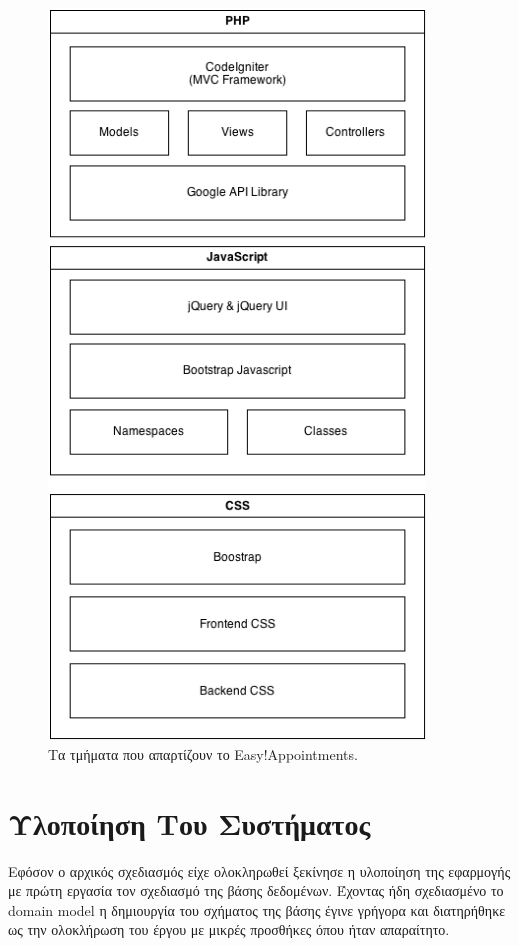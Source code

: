 \begin{figure}[ht!]
\centering
\includegraphics[width=100mm]{images/system-architecture.png}
\caption{Τα τμήματα που απαρτίζουν το Easy!Appointments.}
\label{system-architecture}
\end{figure}

\section{Υλοποίηση Του Συστήματος}
Εφόσον ο αρχικός σχεδιασμός είχε ολοκληρωθεί ξεκίνησε η υλοποίηση της εφαρμογής με πρώτη εργασία τον σχεδιασμό της βάσης δεδομένων. Έχοντας ήδη σχεδιασμένο το domain model η δημιουργία του σχήματος της βάσης έγινε γρήγορα και διατηρήθηκε ως την ολοκλήρωση του έργου με μικρές προσθήκες όπου ήταν απαραίτητο. 

